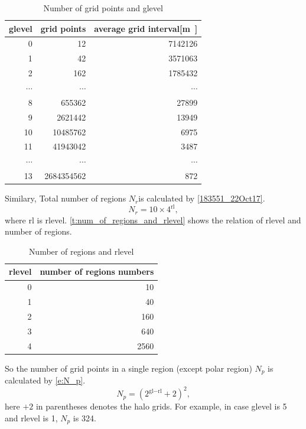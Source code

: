 \begin{table}[htb]
\centering
\caption{Number of grid points and glevel}
\label{t:num_of_grid_points_and_glevel}
\small
\begin{tabular}{|r|r|r|}
\hline
glevel& grid points & average grid interval[\si{\meter]}\\
\hline
 0&  \num{12}&         \num{7142126}\\
\hline
 1&  \num{42}&         \num{3571063} \\
\hline
 2&  \num{162}&        \num{1785432} \\
\hline
 $\cdots$ & $\cdots$& $\cdots$\\
\hline
 8&  \num{655362}&     \num{27899}\\
\hline
 9&  \num{2621442}&    \num{13949}\\
\hline
 10& \num{10485762}&   \num{6975}\\
\hline
 11& \num{41943042}&   \num{3487}\\
\hline
$\cdots$ & $\cdots$& $\cdots$\\
\hline
 13& \num{2684354562}& \num{872}\\
\hline
\end{tabular}
\end{table}


Similary, Total number of regions $N_r$is calculated by \autoref{183551_22Oct17}.
%
\begin{equation}
 N_r = 10 \times 4^\text{rl}, \label{183551_22Oct17}
\end{equation}
%
where $\text{rl}$ is rlevel.
%
\autoref{t:num_of_regions_and_rlevel} shows the relation of rlevel and number of regions.

\begin{table}[htb]
\centering
\caption{Number of regions and rlevel}
\label{t:num_of_regions_and_rlevel}
\small
\begin{tabular}{|r|r|}
\hline
rlevel& number of regions numbers\\
\hline
 0& 10 \\
\hline
 1& 40 \\
\hline
 2& 160 \\
\hline
 3& 640 \\
\hline
 4& 2560 \\
\hline
\end{tabular}
\end{table}

So the number of grid points in a single region (except polar region) $N_p$ is calculated by
\autoref{e:N_p}.
%
\begin{equation}
 N_p = (2 ^ {\text{gl} - \text{rl}} + 2 )^2, \label{e:N_p}
\end{equation}
%
here $+2$ in parentheses denotes the halo grids.
%
For example, in case glevel is 5 and rlevel is 1, $N_p$ is 324.
%
